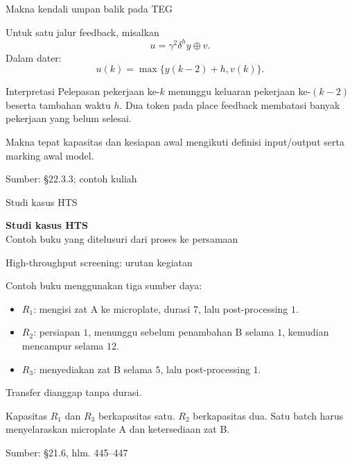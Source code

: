 \documentclass[aspectratio=169,11pt]{beamer}
\newcommand{\source}[1]{%
    \vfill
    \hfill{\tiny\color{gray}Sumber: #1}
}
\begin{document}
\begin{frame}{Makna kendali umpan balik pada TEG}

Untuk satu jalur feedback, misalkan
\[
u=\gamma^2\delta^h y\oplus v.
\]
Dalam dater:
\[
u(k)=\max\{y(k-2)+h,v(k)\}.
\]
\begin{exampleblock}{Interpretasi}
Pelepasan pekerjaan ke-$k$ menunggu keluaran pekerjaan ke-$(k-2)$
beserta tambahan waktu $h$.
Dua token pada place feedback membatasi banyak pekerjaan yang belum selesai.
\end{exampleblock}
Makna tepat kapasitas dan kesiapan awal mengikuti definisi input/output
serta marking awal model.

\source{\S22.3.3; contoh kuliah}
\end{frame}
\begin{frame}{Studi kasus HTS}
\begin{center}{\LARGE\bfseries\color{AcademicBlue}Studi kasus HTS}\\[8mm]Contoh buku yang ditelusuri dari proses ke persamaan\end{center}
\end{frame}
\begin{frame}{High-throughput screening: urutan kegiatan}

Contoh buku menggunakan tiga sumber daya:
\begin{itemize}
\item $R_1$: mengisi zat A ke microplate, durasi $7$, lalu post-processing $1$.
\item $R_2$: persiapan $1$, menunggu sebelum penambahan B selama $1$,
kemudian mencampur selama $12$.
\item $R_3$: menyediakan zat B selama $5$, lalu post-processing $1$.
\end{itemize}
Transfer dianggap tanpa durasi.
\begin{block}{Kapasitas}
$R_1$ dan $R_3$ berkapasitas satu. $R_2$ berkapasitas dua.
Satu batch harus menyelaraskan microplate A dan ketersediaan zat B.
\end{block}

\source{\S21.6, hlm. 445--447}
\end{frame}
\end{document}
